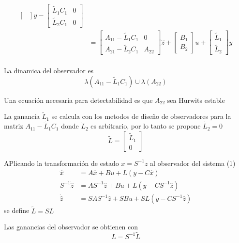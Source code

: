 \[\begin{split}
\begin{bmatrix}
        \end{bmatrix} y -
        \begin{bmatrix}
            \tilde{L}_{1}C_{1} & 0 \\
            \tilde{L}_{2}C_{1} & 0
        \end{bmatrix} \\
        & = 
        \begin{bmatrix}
            A_{11}-\tilde{L}_{1}C_{1} & 0 \\
            A_{21}-\tilde{L}_{2}C_{1} & A_{22}
        \end{bmatrix} \hat{z} +
        \begin{bmatrix}
            B_{1} \\ B_{2}
        \end{bmatrix} u
        +
        \begin{bmatrix}
            \tilde{L}_{1} \\ \tilde{L}_{2}
        \end{bmatrix} y \\
    \end{split}
\]

La dinamica del observador es
\[
    \lambda(A_{11} - \tilde{L}_{1}C_{1}) \cup \lambda(A_{22})
\]

Una ecuación necesaria para detectabilidad es que \( A_{22} \) sea Hurwits estable

La ganancia \( \tilde{L}_{1} \) se calcula con los metodos de diseño de observadores para la matriz \( A_{11}-\tilde{L}_{1}C_{1} \) donde \( \tilde{L}_{2} \) es arbitrario, por lo tanto se propone \( \tilde{L}_{2} = 0 \)
\[
    \tilde{L} = 
    \begin{bmatrix}
        \tilde{L}_{1} \\ 0    
    \end{bmatrix}
\]

APlicando la transformación de estado \( x = S^{-1}z \) al observador del sistema (1) 
\[
    \begin{split}
        \hat{x} & = A\hat{x} + Bu + L(y-C\hat{x}) \\
        S^{-1}\dot{\hat{z}} & = AS^{-1}\hat{z} + Bu + L(y-CS^{-1}\hat{z}) \\
        \dot{\hat{z}} & = SAS^{-1}\hat{z} + SBu + SL (y-CS^{-1}\hat{z})
    \end{split}
\]
se define \( \tilde{L} = SL \)

Las ganancias del observador se obtienen con 
\[
    L = S^{-1}\tilde{L}
\]